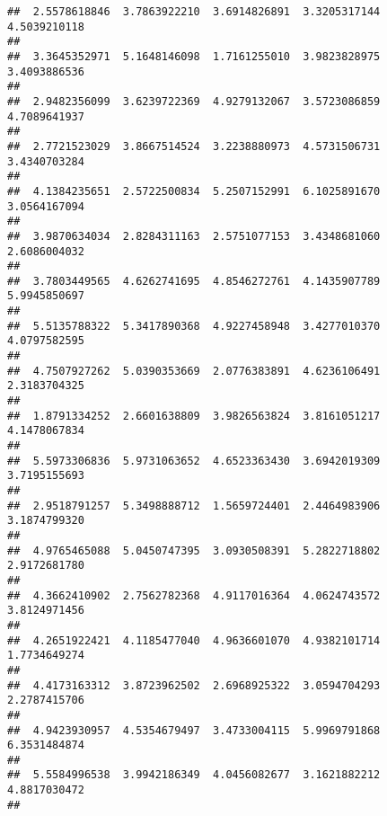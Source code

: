 \documentclass[]{article}
\begin{document}
\begin{verbatim}
##  2.5578618846  3.7863922210  3.6914826891  3.3205317144  4.5039210118 
##                                                                       
##  3.3645352971  5.1648146098  1.7161255010  3.9823828975  3.4093886536 
##                                                                       
##  2.9482356099  3.6239722369  4.9279132067  3.5723086859  4.7089641937 
##                                                                       
##  2.7721523029  3.8667514524  3.2238880973  4.5731506731  3.4340703284 
##                                                                       
##  4.1384235651  2.5722500834  5.2507152991  6.1025891670  3.0564167094 
##                                                                       
##  3.9870634034  2.8284311163  2.5751077153  3.4348681060  2.6086004032 
##                                                                       
##  3.7803449565  4.6262741695  4.8546272761  4.1435907789  5.9945850697 
##                                                                       
##  5.5135788322  5.3417890368  4.9227458948  3.4277010370  4.0797582595 
##                                                                       
##  4.7507927262  5.0390353669  2.0776383891  4.6236106491  2.3183704325 
##                                                                       
##  1.8791334252  2.6601638809  3.9826563824  3.8161051217  4.1478067834 
##                                                                       
##  5.5973306836  5.9731063652  4.6523363430  3.6942019309  3.7195155693 
##                                                                       
##  2.9518791257  5.3498888712  1.5659724401  2.4464983906  3.1874799320 
##                                                                       
##  4.9765465088  5.0450747395  3.0930508391  5.2822718802  2.9172681780 
##                                                                       
##  4.3662410902  2.7562782368  4.9117016364  4.0624743572  3.8124971456 
##                                                                       
##  4.2651922421  4.1185477040  4.9636601070  4.9382101714  1.7734649274 
##                                                                       
##  4.4173163312  3.8723962502  2.6968925322  3.0594704293  2.2787415706 
##                                                                       
##  4.9423930957  4.5354679497  3.4733004115  5.9969791868  6.3531484874 
##                                                                       
##  5.5584996538  3.9942186349  4.0456082677  3.1621882212  4.8817030472 
##                                                                       

\end{verbatim}
\end{document}
